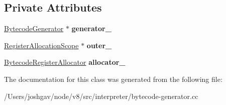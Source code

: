 \subsection*{Private Attributes}
\begin{DoxyCompactItemize}
\item 
\hyperlink{classv8_1_1internal_1_1interpreter_1_1_bytecode_generator}{Bytecode\+Generator} $\ast$ {\bfseries generator\+\_\+}\hypertarget{classv8_1_1internal_1_1interpreter_1_1_bytecode_generator_1_1_register_allocation_scope_a96ecc15ed522351475a18ba3a9bfec2b}{}\label{classv8_1_1internal_1_1interpreter_1_1_bytecode_generator_1_1_register_allocation_scope_a96ecc15ed522351475a18ba3a9bfec2b}

\item 
\hyperlink{classv8_1_1internal_1_1interpreter_1_1_bytecode_generator_1_1_register_allocation_scope}{Register\+Allocation\+Scope} $\ast$ {\bfseries outer\+\_\+}\hypertarget{classv8_1_1internal_1_1interpreter_1_1_bytecode_generator_1_1_register_allocation_scope_a2776bc409b96bab780d6f39142711db2}{}\label{classv8_1_1internal_1_1interpreter_1_1_bytecode_generator_1_1_register_allocation_scope_a2776bc409b96bab780d6f39142711db2}

\item 
\hyperlink{classv8_1_1internal_1_1interpreter_1_1_bytecode_register_allocator}{Bytecode\+Register\+Allocator} {\bfseries allocator\+\_\+}\hypertarget{classv8_1_1internal_1_1interpreter_1_1_bytecode_generator_1_1_register_allocation_scope_a842bae3c4e3c14c22cb94d2fcdb1565d}{}\label{classv8_1_1internal_1_1interpreter_1_1_bytecode_generator_1_1_register_allocation_scope_a842bae3c4e3c14c22cb94d2fcdb1565d}

\end{DoxyCompactItemize}


The documentation for this class was generated from the following file\+:\begin{DoxyCompactItemize}
\item 
/\+Users/joshgav/node/v8/src/interpreter/bytecode-\/generator.\+cc\end{DoxyCompactItemize}
